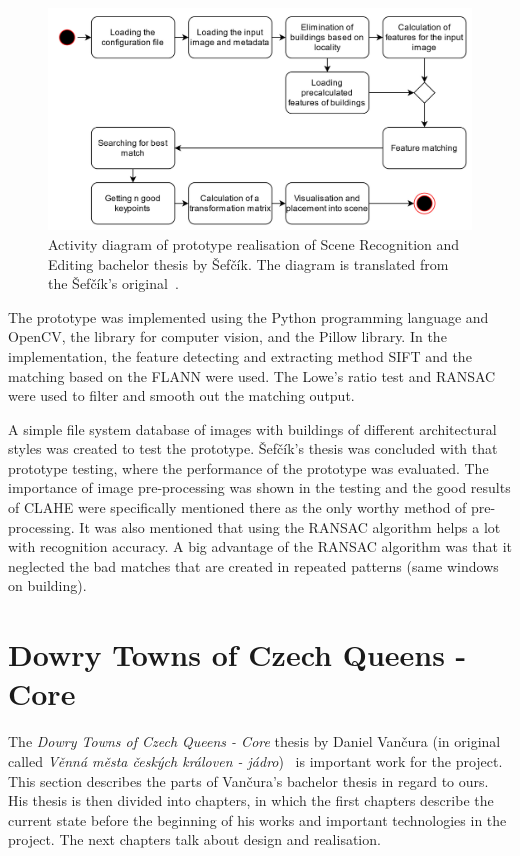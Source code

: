 \documentclass[thesis=B,english]{FITthesis}[2019/12/23]
\begin{document}
        \begin{figure}
            \centering
            \includegraphics[width = 0.9\linewidth] {pictures/Sefcik/sefcikRealizaceDiagramAktivit.jpg}
            \caption[Activity diagram of prototype realisation of Scene Recognition and Editing bachelor thesis by Šefčík]{Activity diagram of prototype realisation of Scene Recognition and Editing bachelor thesis by Šefčík. The diagram is translated from the Šefčík's original~\cite{Sefcik2020}.}
            \label{img:sefcikDiagramAktivit}
        \end{figure}
        
        The prototype was implemented using the Python programming language and OpenCV, the library for computer vision, and the Pillow library. In the implementation, the feature detecting and extracting method SIFT and the matching based on the FLANN were used. The Lowe's ratio test and RANSAC were used to filter and smooth out the matching output.
        
        A simple file system database of images with buildings of different architectural styles was created to test the prototype. Šefčík’s thesis was concluded with that prototype testing, where the performance of the prototype was evaluated. The importance of image pre-processing was shown in the testing and the good results of CLAHE were specifically mentioned there as the only worthy method of pre-processing. It was also mentioned that using the RANSAC algorithm helps a lot with recognition accuracy. A big advantage of the RANSAC algorithm was that it neglected the bad matches that are created in repeated patterns (same windows on building).
            
    \section{Dowry Towns of Czech Queens - Core}
        The \textit{Dowry Towns of Czech Queens - Core} thesis by Daniel Vančura (in original called \textit{Věnná města českých královen - jádro})~\cite{Vancura2020} is important work for the project. This section describes the parts of Vančura's bachelor thesis in regard to ours. His thesis is then divided into chapters, in which the first chapters describe the current state before the beginning of his works and important technologies in the project. The next chapters talk about design and realisation.
\end{document}
